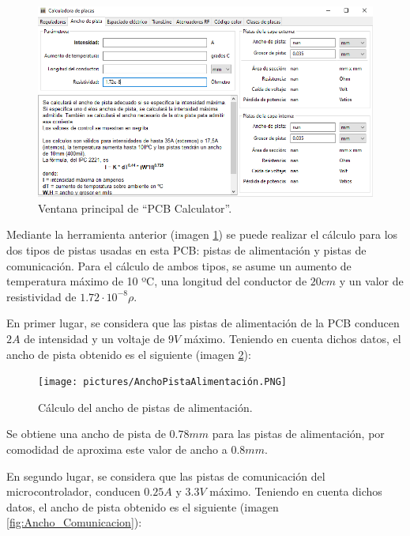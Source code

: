 \begin{figure}[H]
\centering 
\includegraphics[width=0.9\linewidth]{pictures/PCBCalculator.PNG}
\caption{Ventana principal de ``PCB Calculator''.}
\label{fig:Pcb_Calculator}
\end{figure}

Mediante la herramienta anterior (imagen \ref{fig:Pcb_Calculator}) se puede realizar el cálculo para los dos tipos de pistas usadas en esta \ac{PCB}: pistas de alimentación y pistas de comunicación. Para el cálculo de ambos tipos, se asume un aumento de temperatura máximo de 10 ºC, una longitud del conductor de $20cm$ y un valor de resistividad de $1.72 \cdot 10^{-8}\rho$.

En primer lugar, se considera que las pistas de alimentación de la \ac{PCB} conducen $2A$ de intensidad y un voltaje de $9V$ máximo. Teniendo en cuenta dichos datos, el ancho de pista obtenido es el siguiente (imagen \ref{fig:Ancho_Alimentacion}):

\begin{figure}[H]
\centering 
\texttt{[image: pictures/AnchoPistaAlimentación.PNG]}
\caption{Cálculo del ancho de pistas de alimentación.}
\label{fig:Ancho_Alimentacion}
\end{figure}
 
 Se obtiene una ancho de pista de $0.78mm$ para las pistas de alimentación, por comodidad de aproxima este valor de ancho a $0.8mm$.
 
 En segundo lugar, se considera que las pistas de comunicación del microcontrolador, conducen $0.25A$ y $3.3V$ máximo. Teniendo en cuenta dichos datos, el ancho de pista obtenido es el siguiente (imagen \ref{fig:Ancho_Comunicacion}):
 
